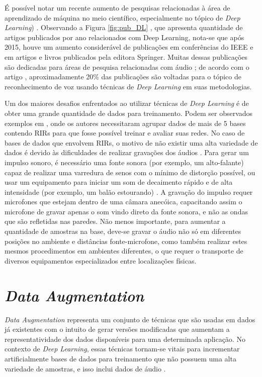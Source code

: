 É possível notar um recente aumento de pesquisas relacionadas à área de aprendizado de máquina no meio científico, especialmente no tópico de 
\textit{Deep Learning}) \cite{Study_SR_DL}. Observando a Figura \ref{fig:pub_DL} \cite{Jounal_Awareness_DL}, que apresenta quantidade de artigos
publicados por ano relacionados com Deep Learning, nota-se que após 2015, houve um aumento 
considerável de publicações em conferências do IEEE e em artigos e livros publicados pela editora Springer\textregistered.
Muitas dessas publicações são dedicadas para áreas de pesquisa relacionadas com áudio \cite{Study_SR_DL, Speech_proc_plus_DL, Source_Sep_DL}; de acordo com o artigo \cite{Survey_DL}, aproximadamente 20\% 
das publicações são voltadas para o tópico de reconhecimento de voz usando técnicas de \textit{Deep Learning} em suas metodologias.

Um dos maiores desafios enfrentados ao utilizar técnicas de \textit{Deep Learning} é de obter uma grande quantidade de dados para treinamento.
Podem ser observados exemplos em \cite{Estimation_RT_DRR,ACE_Data_Aug_Eval}, onde os autores necessitaram agrupar dados de mais de 5 bases contendo
RIRs para que fosse possível treinar e avaliar suas redes.
No caso de bases de dados que envolvem RIRs, o motivo de não existir uma alta variedade de dados é devido às dificuldades
de realizar gravações dos áudios \cite{Recording_RIR_2}.
Para gerar um impulso sonoro, é necessário uma fonte sonora (por exemplo, um alto-falante) capaz de realizar uma varredura de senos com o mínimo de distorção
possível, ou usar um equipamento para iniciar um som de decaimento rápido e de alta intensidade (por exemplo, um balão estourando) \cite{Recording_RIR}.
A gravação do impulso requer microfones que estejam dentro de uma câmara anecóica, capacitando assim o microfone de gravar apenas o som vindo direto
da fonte sonora, e não as ondas que são refletidas nas paredes.
Não menos importante, para aumentar a quantidade de amostras na base, deve-se gravar o áudio não só em diferentes posições no ambiente
e distâncias fonte-microfone, como também realizar estes mesmos procedimentos em ambientes diferentes, o que requer o transporte de diversos equipamentos
especializados entre localizações físicas.

\section{\textit{Data Augmentation}}

\textit{Data Augmentation} representa um conjunto de técnicas que são usadas em dados já existentes com o intuito de gerar versões
modificadas que aumentam a representatividade dos dados disponíveis para uma determinada aplicação. 
No contexto de \textit{Deep Learning}, essas técnicas tornam-se vitais para incrementar artificialmente bases de dados
para treinamento que não possuem uma alta variedade de amostras, e isso inclui dados de áudio \cite{DL_Data_Aug_sc,Metric_Data_Aug_sc}.

